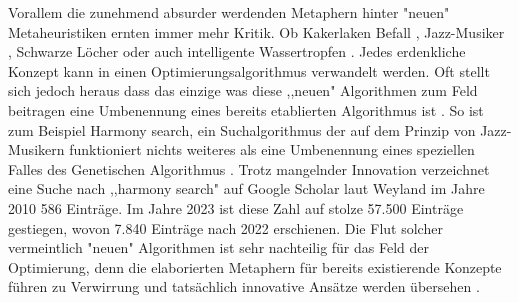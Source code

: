Vorallem die zunehmend absurder werdenden Metaphern hinter "neuen" Metaheuristiken ernten immer mehr Kritik. Ob Kakerlaken Befall \cite*{MetaheuristicsExampleRoachInfestation}, Jazz-Musiker \cite*{MetaheuristicsExampleHarmonySearch}, Schwarze Löcher \cite*{MetaheuristicsExampleBlackHole} oder auch intelligente Wassertropfen \cite*{MetaheuristicsExampleIntelligentWaterDrops}. Jedes erdenkliche Konzept kann in einen Optimierungsalgorithmus verwandelt werden. Oft stellt sich jedoch heraus dass das einzige was diese ,,neuen" Algorithmen zum Feld beitragen eine Umbenennung eines bereits etablierten Algorithmus ist \cite*{NoNovelty}. So ist zum Beispiel Harmony search, ein Suchalgorithmus der auf dem Prinzip von Jazz-Musikern funktioniert nichts weiteres als eine Umbenennung eines speziellen Falles des Genetischen Algorithmus \cite*{HarmonySearch}. Trotz mangelnder Innovation verzeichnet eine Suche nach ,,harmony search" auf Google Scholar laut Weyland im Jahre 2010 586 Einträge. Im Jahre 2023 ist diese Zahl auf stolze 57.500 Einträge gestiegen, wovon 7.840 Einträge nach 2022 erschienen. Die Flut solcher vermeintlich "neuen" Algorithmen ist sehr nachteilig für das Feld der Optimierung, denn die elaborierten Metaphern für bereits existierende Konzepte führen zu Verwirrung und tatsächlich innovative Ansätze werden übersehen \cite*{MetaheuristicsExposed}.